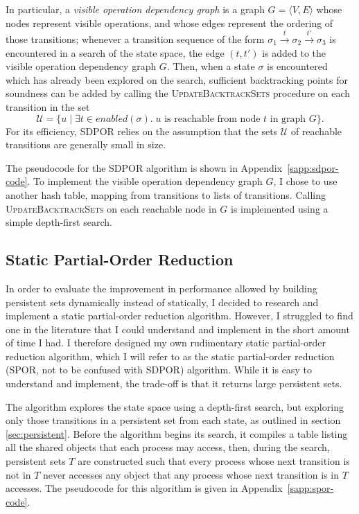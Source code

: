 \documentclass[12pt,a4paper,twoside,openright]{report}
\begin{document}
In particular, a \emph{visible operation dependency
graph} is a graph $G = \langle V, E \rangle$ whose
nodes represent visible operations, and whose edges
represent the ordering of those transitions; whenever
a transition sequence of the form
$\sigma_1 \xrightarrow{t} \sigma_2 \xrightarrow{t'}
 \sigma_3$
is encountered in a search of the state space, the
edge $(t, t')$ is added to the visible operation
dependency graph $G$. Then, when a state $\sigma$ is
encountered which has already been explored on the
search, sufficient backtracking points for soundness
can be added by calling the
\textsc{UpdateBacktrackSets} procedure
on each transition in the set
\[\mathcal{U} = \{u \mid \exists t \in \textit{enabled}(\sigma).\;
   u \text{ is reachable from node } t \text{ in graph } G\}.\]
For its efficiency, SDPOR relies on the assumption that
the sets $\mathcal{U}$ of reachable transitions
are generally small in size.

The pseudocode for the SDPOR algorithm is shown
in Appendix~\ref{sapp:sdpor-code}.
To implement the visible operation dependency graph
$G$, I chose to use another hash table,
mapping from transitions to lists of transitions.
Calling \textsc{UpdateBacktrackSets} on
each reachable node in $G$ is implemented using
a simple depth-first search.

\subsection{Static Partial-Order Reduction}
\label{sec:spor-imp}

In order to evaluate the improvement in performance
allowed by building persistent sets dynamically
instead of statically, I decided to research and
implement a static partial-order reduction
algorithm. However, I struggled to find one
in the literature that I could
understand and implement in the short amount
of time I had. I therefore designed my own
rudimentary static partial-order reduction algorithm,
which I will refer to as the static partial-order reduction
(SPOR, not to be confused with SDPOR) algorithm.
While it is easy to understand and implement,
the trade-off is that it returns large persistent sets.

The algorithm explores the state space using a
depth-first search, but exploring only those
transitions in a persistent set from each
state, as outlined in section \ref{sec:persistent}.
Before the algorithm begins its search, it compiles a table
listing all the shared objects that each process may
access, then, during the search, persistent sets $T$ are
constructed such that
every process whose next transition is
not in $T$ never accesses any
object that any process whose next
transition is in $T$ accesses.
The pseudocode for this algorithm is
given in Appendix~\ref{sapp:spor-code}.
\end{document}
